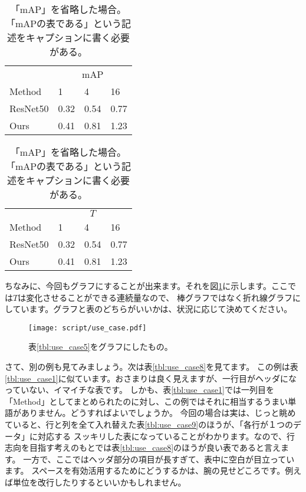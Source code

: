 \documentclass[uplatex,onecolumn,9pt,dvipdfmx]{jsarticle}
\newcommand{\Tref}[1]{表\ref{#1}}
\newcommand{\Fref}[1]{図\ref{#1}}
\begin{document}
\begin{table}[h]
    \begin{minipage}{0.48\linewidth}
        \centering
        \begin{tabular}{@{}llll@{}} \toprule
            & \multicolumn{3}{c}{mAP} \\ \cmidrule(l){2-4}
            Method & 1 & 4 & 16 \\ \midrule
            ResNet50  & 0.32 & 0.54 & 0.77 \\ 
            Ours      & 0.41 & 0.81 & 1.23 \\ \bottomrule   
        \end{tabular}
        \caption{「$T=$」を省略した場合。ここでは1, 4, 16の意味が通じなくなってしまっており、よくない表になっている。}
        \label{tbl:use_case6}
    \end{minipage}
    \hfill
    \begin{minipage}{0.48\linewidth}
        \centering
        \begin{tabular}{@{}llll@{}} \toprule
            & \multicolumn{3}{c}{$T$} \\ \cmidrule(l){2-4}
            Method & 1 & 4 & 16 \\ \midrule
            ResNet50  & 0.32 & 0.54 & 0.77 \\ 
            Ours      & 0.41 & 0.81 & 1.23 \\ \bottomrule   
        \end{tabular}
        \caption{「mAP」を省略した場合。「mAPの表である」という記述をキャプションに書く必要がある。}
        \label{tbl:use_case7}
    \end{minipage}
\end{table}

ちなみに、今回もグラフにすることが出来ます。それを\Fref{fig:use_case}に示します。ここでは$T$は変化させることができる連続量なので、
棒グラフではなく折れ線グラフにしています。グラフと表のどちらがいいかは、状況に応じて決めてください。

\begin{figure}[h]
    \centering
    \texttt{[image: script/use\_case.pdf]}
    \caption{\Tref{tbl:use_case5}をグラフにしたもの。}
    \label{fig:use_case}
\end{figure}






さて、別の例も見てみましょう。次は\Tref{tbl:use_case8}を見てます。
この例は\Tref{tbl:use_case1}に似ています。おさまりは良く見えますが、一行目がヘッダになっていない、イマイチな表です。
しかも、\Tref{tbl:use_case1}では一列目を「Method」としてまとめられたのに対し、この例ではそれに相当するうまい単語がありません。どうすればよいでしょうか。
今回の場合は実は、じっと眺めていると、行と列を全て入れ替えた\Tref{tbl:use_case9}のほうが、「各行が１つのデータ」に対応する
スッキリした表になっていることがわかります。なので、行志向を目指す考えのもとでは\Tref{tbl:use_case8}のほうが良い表であると言えます。
一方で、ここではヘッダ部分の項目が長すぎて、表中に空白が目立っています。
スペースを有効活用するためにどうするかは、腕の見せどころです。例えば単位を改行したりするといいかもしれません。
\end{document}
